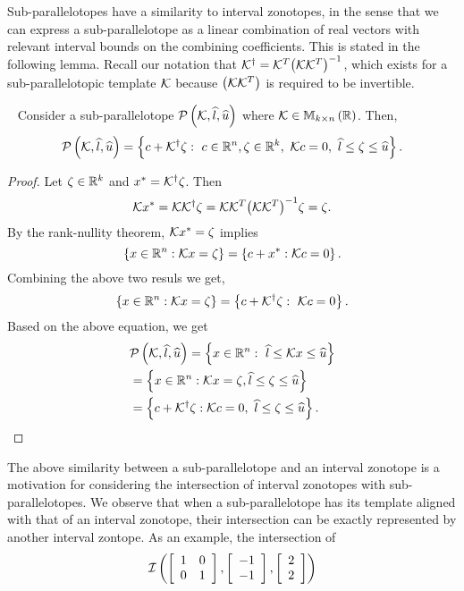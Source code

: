 Sub-parallelotopes have a similarity to interval zonotopes, in the
sense that we can express a sub-parallelotope as a linear combination
of real vectors with relevant interval bounds on the combining
coefficients.  This is stated in the following lemma.  Recall
our notation that
${\mathcal{K}}^\dagger={\mathcal{K}}^T{\left(\mathcal{K}{\mathcal{K}}^T\right)}^{-1}$,
which exists for a sub-parallelotopic template $\mathcal{K}$ because
$\left(\mathcal{K}{\mathcal{K}}^T\right)$ is required to be invertible.
%
\begin{lemma}~\label{lem:ptope-iz-conversion}
  Consider a sub-parallelotope
  $\mathcal{P}\left(\mathcal{K},\widehat{l},\widehat{u}\right)$ where $\mathcal{K}\in\mathbb{M}_{k\times n}\left(\mathbb{R}\right)$.
  Then,
  \[
  \mathcal{P}\left(\mathcal{K},\widehat{l},\widehat{u}\right)=\left\{c+{\mathcal{K}}^\dagger\zeta:~c\in\mathbb{R}^n,\zeta\in\mathbb{R}^k,~\mathcal{K}
  c=0,~\widehat{l}\leq
  \zeta\leq \widehat{u}
  \right\}.
  \]
%
\end{lemma}
%
\begin{proof}
Let $\zeta\in\mathbb{R}^k$ and $x^*={\mathcal{K}}^\dagger\zeta$.  Then
%
\[
\mathcal{K} x^*=\mathcal{K}{\mathcal{K}}^\dagger\zeta = \mathcal{K}\mathcal{K}^T{\left(\mathcal{K}\mathcal{K}^T\right)}^{-1}\zeta=\zeta.
\]
%
By the rank-nullity theorem, $\mathcal{K} x^* = \zeta$ implies
%
\begin{equation}
\left\{x\in\mathbb{R}^n:\mathcal{K} x=\zeta\right\}=\left\{c+x^*:\mathcal{K} c=0\right\}.
\end{equation}
%
Combining the above two resuls we get,
%
\begin{equation}
\left\{x\in\mathbb{R}^n:\mathcal{K} x=\zeta\right\}=\left\{c+{\mathcal{K}}^\dagger\zeta:~\mathcal{K} c=0\right\}.
\end{equation}
%
Based on the above equation, we get
%
\begin{align*}
& \mathcal{P}\left(\mathcal{K},\widehat{l},\widehat{u}\right) = \left\{x\in\mathbb{R}^n:~\widehat{l}\leq \mathcal{K} x\leq\widehat{u}\right\}\nonumber\\
& = \left\{x\in\mathbb{R}^n:\mathcal{K}
  x=\zeta, \widehat{l}\leq \zeta\leq\widehat{u}\right\}\nonumber\\
& = \left\{c+{\mathcal{K}}^\dagger\zeta:\mathcal{K} c=0,~\widehat{l}\leq\zeta\leq\widehat{u}\right\}.~~~\qedhere
\end{align*}
%
\end{proof}
%
The above similarity between a sub-parallelotope and an interval
zonotope is a motivation for considering the intersection of interval
zonotopes with sub-parallelotopes.  We observe that when a
sub-parallelotope has its template aligned with that of an interval
zonotope, their intersection can be exactly represented by another
interval zontope.  As an example, the intersection of
%
\[
\mathit{\operatorname{\mathcal{I}}}\left(\left[\begin{array}{l l}1 & 0 \\ 0 &
      1\end{array}\right],\left[\begin{array}{c}-1\\ -1\end{array}\right],\left[\begin{array}{c}2\\ 2\end{array}\right]\right)
\]
